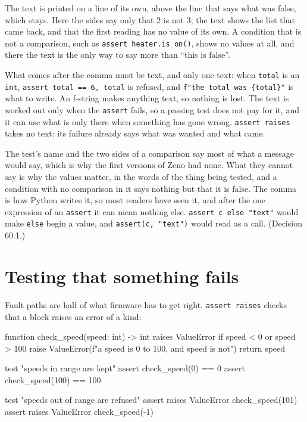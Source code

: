 The text is printed on a line of its own, above the line that says
what was false, which stays. Here the sides say only that 2 is not 3;
the text shows the list that came back, and that the first reading
has no value of its own. A condition that is not a comparison, such
as \verb|assert heater.is_on()|, shows no values at all, and there the
text is the only way to say more than ``this is false''.

What comes after the comma must be text, and only one text: when
\verb|total| is an \verb|int|, \verb|assert total == 6, total| is
refused, and \verb|f"the total was {total}"| is what to write. An
f-string makes anything text, so nothing is lost. The
text is worked out only when the \verb|assert| fails, so a passing
test does not pay for it, and it can use what is only there when
something has gone wrong. \verb|assert raises| takes no text: its
failure already says what was wanted and what came.

\begin{why}
The test's name and the two sides of a comparison say most of what a
message would say, which is why the first versions of Zeno had none.
What they cannot say is why the values matter, in the words of the
thing being tested, and a condition with no comparison in it says
nothing but that it is false. The comma is how Python writes it, so
most readers have seen it, and after the one expression of an
\verb|assert| it can mean nothing else. \verb|assert c else "text"|
would make \verb|else| begin a value, and \verb|assert(c, "text")|
would read as a call. (Decision 60.1.)
\end{why}

\section{Testing that something fails}

Fault paths are half of what firmware has to get right. \verb|assert raises|
 checks that a block raises an error of a kind:

\begin{zeno}[file=speed.zeno, dir=raises, cmd=zeno test {file}]
function check_speed(speed: int) -> int raises ValueError {
    if speed < 0 or speed > 100 {
        raise ValueError(f"a speed is 0 to 100, and {speed} is not")
    }
    return speed
}

test "speeds in range are kept" {
    assert check_speed(0) == 0
    assert check_speed(100) == 100
}

test "speeds out of range are refused" {
    assert raises ValueError {
        check_speed(101)
    }
    assert raises ValueError {
        check_speed(-1)
    }
}
\end{zeno}

